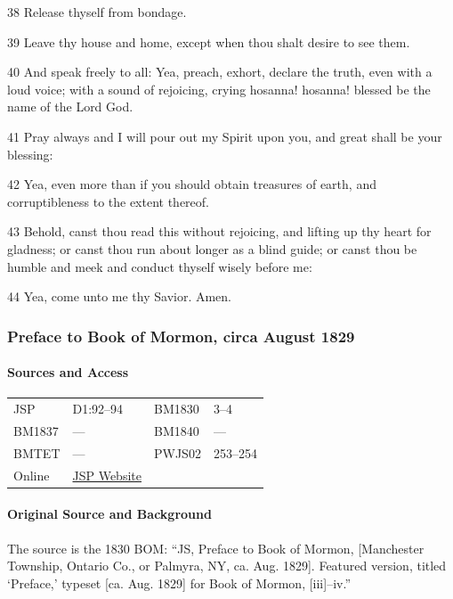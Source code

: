 				38 Release thyself from bondage.

				39 Leave thy house and home, except when thou shalt desire to see them.

				40 And speak freely to all: Yea, preach, exhort, declare the truth, even with a loud voice; with a sound of rejoicing, crying hosanna! hosanna! blessed be the name of the Lord God.

				41 Pray always and I will pour out my Spirit upon you, and great shall be your blessing:

				42 Yea, even more than if you should obtain treasures of earth, and corruptibleness to the extent thereof.

				43 Behold, canst thou read this without rejoicing, and lifting up thy heart for gladness; or canst thou run about longer as a blind guide; or canst thou be humble and meek and conduct thyself wisely before me:

				44 Yea, come unto me thy Savior. Amen.
			
		\subsubsection{Preface to Book of Mormon, circa August 1829}
			\label{EMS-1828-1829-JS-CIR-AUG-1829}
			
			\paragraph{Sources and Access}

				\begin{tabular}{p{1in}p{1.5in}p{1in}p{1.5in}}
				JSP	 	& D1:92--94		& BM1830	& 3--4		\\
				BM1837	& ---			& BM1840	& ---		\\
				BMTET	& ---			& PWJS02	& 253--254	\\
				Online  & \href{https://www.josephsmithpapers.org/paper-summary/preface-to-book-of-mormon-circa-august-1829/1}{JSP Website} & \phantom{.} & \phantom{.} \\
				\end{tabular}
			
			\paragraph{Original Source and Background}
			
				The source is the 1830 BOM: ``JS, Preface to Book of Mormon, [Manchester Township, Ontario Co., or Palmyra, NY, ca. Aug. 1829]. Featured version, titled `Preface,' typeset [ca. Aug. 1829] for Book of Mormon, [iii]--iv.''
			
